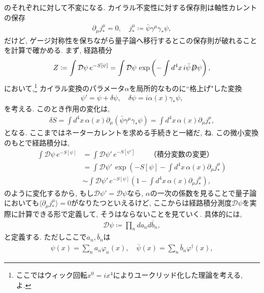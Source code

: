 \documentclass{ltjsarticle}
\theoremstyle{definition}
\def\slash#1{\!\!\not\!\!#1}
\def\dsla{\,\slash{D}}
\begin{document}
のそれぞれに対して不変になる. カイラル不変性に対する保存則は軸性カレントの保存
\begin{gather}
  \partial_\mu j^\mu_\ast=0,\quad j^\mu_\ast\coloneqq\bar\psi\gamma^\mu\gamma_\ast\psi,
\end{gather}
だけど, ゲージ対称性を保ちながら量子論へ移行するとこの保存則が破れることを計算で確かめる. まず, 経路積分
\begin{gather}
  Z\coloneqq\int\mathcal D\psi\,e^{-S[\psi]}=\int\mathcal D\psi\,\exp\left(-\int d^4x\,i\bar\psi\dsla\psi\right),
\end{gather}
において,\footnote{ここではウィック回転$x^0=ix^4$によりユークリッド化した理論を考える, よ.} カイラル変換のパラメータ$\alpha$を局所的なものに``格上げ"した変換
\begin{gather}
  \psi'=\psi+\delta\psi,\quad\delta\psi=i\alpha(x)\gamma_\ast\psi,\label{eq:local_chiral_transformation}
\end{gather}
を考える. このとき作用の変化は,
\begin{gather}
  \delta S=\int d^4x\,\alpha(x)\partial_\mu\left(\bar\psi\gamma^\mu\gamma_\ast\psi\right)=\int d^4x\,\alpha(x)\partial_\mu j^\mu_\ast,
\end{gather}
となる. ここまではネーターカレントを求める手続きと一緒だ, ね. この微小変換のもとで経路積分は,
\begin{align}
  \int\mathcal D\psi\,e^{-S[\psi]}&=\int\mathcal D\psi'\,e^{-S[\psi']}\qquad\text{（積分変数の変更）}\\
  &=\int \mathcal D\psi'\,\exp\left(-S[\psi]-\int d^4x\,\alpha(x)\partial_\mu j^\mu_\ast\right)\label{eq:partition_function_infinitesimally_transformed}\\
  &\sim\int \mathcal D\psi'\,e^{-S[\psi]}\left(1-\int d^4x\,\alpha(x)\partial_\mu j^\mu_\ast\right),
\end{align}
のように変化するから, もし$\mathcal D\psi'=\mathcal D\psi$なら, $\alpha$の一次の係数を見ることで量子論においても$\langle\partial_\mu j^\mu_\ast\rangle=0$がなりたつといえるけど, ここからは経路積分測度$\mathcal D\psi$を実際に計算できる形で定義して, そうはならないことを見ていく. 具体的には,
\begin{gather}
  \mathcal D\psi\coloneqq\prod_nda_nd\bar b_n,\label{eq:fuctional_measure_fermion}
\end{gather}
と定義する. ただしここで$a_n,\bar b_n$は
\begin{gather}
  \psi(x)=\sum_na_n\varphi_n(x),\quad\bar\psi(x)=\sum_n\bar b_n\varphi^\dagger(x),\label{eq:eigenfunction_expansion}
\end{gather}
\end{document}
